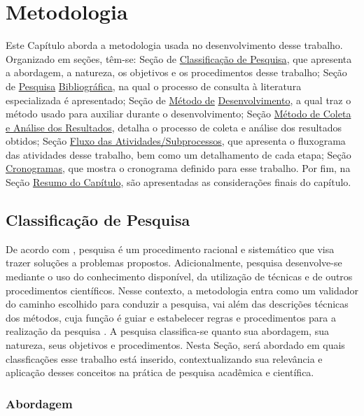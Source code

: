 \chapter[Metodologia]{Metodologia}\label{chap:metodologia}
Este Capítulo aborda a metodologia usada no desenvolvimento desse trabalho. Organizado em seções, têm-se:
Seção de \hyperref[sec:classpesq]{Classificação de Pesquisa}, que apresenta a abordagem, a natureza, os objetivos
e os procedimentos desse trabalho; Seção de \hyperref[sec:metpesq]{Pesquisa} \hyperref[sec:metpesq]{Bibliográfica}, na qual o processo de consulta à literatura especializada 
é apresentado; Seção de \hyperref[sec:metdev]{Método de} \hyperref[sec:metdev]{Desenvolvimento}, a qual traz 
o método usado para auxiliar durante o desenvolvimento; Seção 
\hyperref[sec:expus]{Método de Coleta e Análise dos Resultados}, detalha o processo de coleta e análise
dos resultados obtidos; Seção \hyperref[sec:fluxoatv]{Fluxo das Atividades/Subprocessos}, que apresenta o fluxograma das atividades desse 
trabalho, bem como um detalhamento de cada etapa; Seção \hyperref[sec:cronog]{Cronogramas}, que mostra o cronograma definido 
para esse trabalho. Por fim, na Seção 
\hyperref[sec:resmet]{Resumo do Capítulo}, são apresentadas as considerações finais
do capítulo.

\section{Classificação de Pesquisa}\label{sec:classpesq}

De acordo com , pesquisa é um procedimento racional e sistemático que visa trazer soluções a problemas propostos.
Adicionalmente, pesquisa desenvolve-se mediante o uso do conhecimento disponível, da utilização de técnicas e de outros 
procedimentos científicos. Nesse contexto, a metodologia entra como um validador do caminho escolhido para conduzir a pesquisa,
vai além das descrições técnicas dos métodos, cuja função é guiar e estabelecer regras e procedimentos para a realização
da pesquisa \cite{gerhardt2009metodos}.
A pesquisa classifica-se quanto sua abordagem, sua natureza, seus objetivos e procedimentos. Nesta Seção, será abordado em quais 
classficações esse trabalho está inserido, contextualizando sua relevância e aplicação desses conceitos na
prática de pesquisa acadêmica e científica.

\subsection{Abordagem}\label{subsec:abord}

